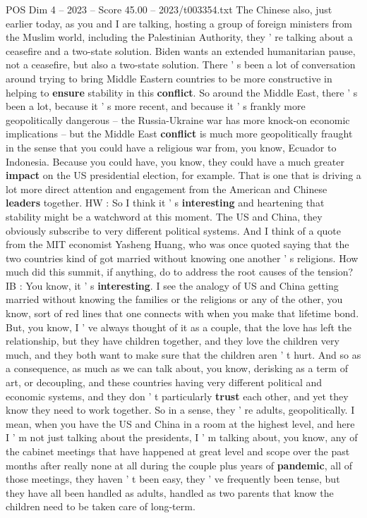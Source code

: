 \begin{textsample}{POS Dim 4 – 2023 – Score 45.00 – 2023/t003354.txt}
The Chinese also, just earlier today, as you and I are talking, hosting a group of foreign ministers from the Muslim world, including the Palestinian Authority, they ' re talking about a ceasefire and a two-state solution.
Biden wants an extended humanitarian pause, not a ceasefire, but also a two-state solution.
There ' s been a lot of conversation around trying to bring Middle Eastern countries to be more constructive in helping to \textbf{ensure} stability in this \textbf{conflict}.
So around the Middle East, there ' s been a lot, because it ' s more recent, and because it ' s frankly more geopolitically dangerous -- the Russia-Ukraine war has more knock-on economic implications -- but the Middle East \textbf{conflict} is much more geopolitically fraught in the sense that you could have a religious war from, you know, Ecuador to Indonesia.
Because you could have, you know, they could have a much greater \textbf{impact} on the US presidential election, for example.
That is one that is driving a lot more direct attention and engagement from the American and Chinese \textbf{leaders} together.
HW : So I think it ' s \textbf{interesting} and heartening that stability might be a watchword at this moment.
The US and China, they obviously subscribe to very different political systems.
And I think of a quote from the MIT economist Yasheng Huang, who was once quoted saying that the two countries kind of got married without knowing one another ' s religions.
How much did this summit, if anything, do to address the root causes of the tension?
IB : You know, it ' s \textbf{interesting}.
I see the analogy of US and China getting married without knowing the families or the religions or any of the other, you know, sort of red lines that one connects with when you make that lifetime bond.
But, you know, I ' ve always thought of it as a couple, that the love has left the relationship, but they have children together, and they love the children very much, and they both want to make sure that the children aren ' t hurt.
And so as a consequence, as much as we can talk about, you know, derisking as a term of art, or decoupling, and these countries having very different political and economic systems, and they don ' t particularly \textbf{trust} each other, and yet they know they need to work together.
So in a sense, they ' re adults, geopolitically.
I mean, when you have the US and China in a room at the highest level, and here I ' m not just talking about the presidents, I ' m talking about, you know, any of the cabinet meetings that have happened at great level and scope over the past months after really none at all during the couple plus years of \textbf{pandemic}, all of those meetings, they haven ' t been easy, they ' ve frequently been tense, but they have all been handled as adults, handled as two parents that know the children need to be taken care of long-term.

\end{textsample}
